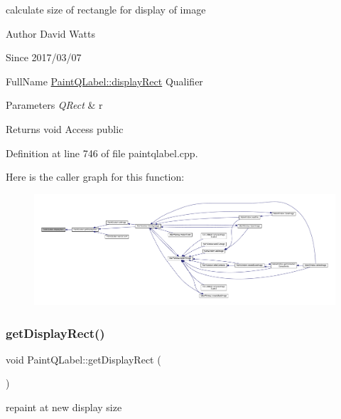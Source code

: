 calculate size of rectangle for display of image

\begin{DoxyAuthor}{Author}
David Watts 
\end{DoxyAuthor}
\begin{DoxySince}{Since}
2017/03/07
\end{DoxySince}
Full\+Name \hyperlink{class_paint_q_label_abe77c4ddb9e176c54374718d1e782af0}{Paint\+Q\+Label\+::display\+Rect} Qualifier 
\begin{DoxyParams}{Parameters}
{\em Q\+Rect} & r \\
\hline
\end{DoxyParams}
\begin{DoxyReturn}{Returns}
void Access public 
\end{DoxyReturn}


Definition at line 746 of file paintqlabel.\+cpp.

Here is the caller graph for this function\+:
\nopagebreak
\begin{figure}[H]
\begin{center}
\leavevmode
\includegraphics[width=350pt]{class_paint_q_label_abe77c4ddb9e176c54374718d1e782af0_icgraph}
\end{center}
\end{figure}
\mbox{\label{class_paint_q_label_a58a4d1f0765a00967529fcbb9cecbc91}} 
\subsubsection{\texorpdfstring{get\+Display\+Rect()}{getDisplayRect()}}
{\footnotesize\ttfamily void Paint\+Q\+Label\+::get\+Display\+Rect (\begin{DoxyParamCaption}{ }\end{DoxyParamCaption})}

repaint at new display size

